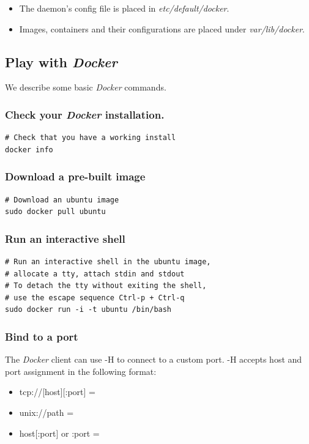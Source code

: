 \documentclass[11pt]{article}
\begin{document}
\begin{itemize}
\item The daemon's config file is placed in \emph{etc/default/docker}.
\item Images, containers and their configurations are placed under \emph{var/lib/docker}.
\end{itemize}
\subsection{Play with \emph{Docker}}
\label{sec-2-2}

We describe some basic \emph{Docker} commands.
\subsubsection{Check your \emph{Docker} installation.}
\label{sec-2-2-1}


\begin{verbatim}
# Check that you have a working install
docker info
\end{verbatim}
\subsubsection{Download a pre-built image}
\label{sec-2-2-2}


\begin{verbatim}
# Download an ubuntu image
sudo docker pull ubuntu
\end{verbatim}
\subsubsection{Run an interactive shell}
\label{sec-2-2-3}


\begin{verbatim}
# Run an interactive shell in the ubuntu image,
# allocate a tty, attach stdin and stdout
# To detach the tty without exiting the shell,
# use the escape sequence Ctrl-p + Ctrl-q
sudo docker run -i -t ubuntu /bin/bash
\end{verbatim}
\subsubsection{Bind to a port}
\label{sec-2-2-4}

The \emph{Docker} client can use -H to connect to a custom port.
-H accepts host and port assignment in the following format: 
\begin{itemize}
\item tcp://[host][:port]  =
\item unix://path =
\item host[:port] or :port =
\end{itemize}
\end{document}
